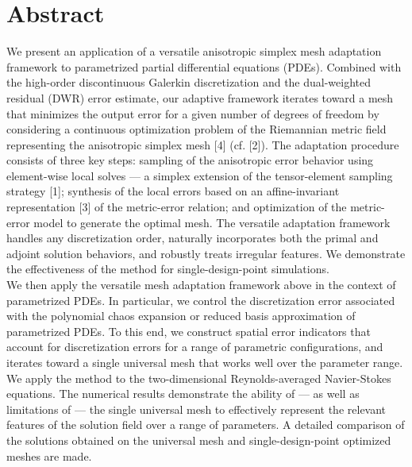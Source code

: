 \documentclass[article,A4,11pt]{llncs}%
\begin{document}
\section*{Abstract}
We present an application of a versatile anisotropic simplex mesh adaptation framework to parametrized partial differential equations (PDEs). Combined with the high-order discontinuous Galerkin discretization and the dual-weighted residual (DWR) error estimate, our adaptive framework iterates toward a mesh that minimizes the output error for a given number of degrees of freedom by considering a continuous
optimization problem of the Riemannian metric field representing the anisotropic simplex mesh [4] (cf. [2]). The adaptation procedure consists of three key steps: sampling of the anisotropic error behavior using element-wise local solves --- a simplex extension of the tensor-element sampling strategy [1]; synthesis of the local errors based on an affine-invariant representation [3] of the metric-error relation; and optimization of the  metric-error model to generate the optimal mesh. The versatile adaptation framework handles any discretization order, naturally incorporates both 
the primal and adjoint solution behaviors, and robustly treats irregular features. We demonstrate the effectiveness of the method for single-design-point simulations.
\\
We then apply the versatile mesh adaptation framework above in the context of
parametrized PDEs. In particular, we control the 
discretization error associated with the polynomial chaos expansion or
reduced basis approximation of parametrized PDEs. To this end, we construct spatial error indicators that account for
discretization errors for a range of parametric configurations, and iterates toward a single universal mesh that works well over the
parameter range. We apply the method to the two-dimensional Reynolds-averaged Navier-Stokes equations. The numerical results demonstrate the ability of --- as well as limitations of --- the single universal mesh to effectively represent the
relevant features of the solution field over a range of parameters. A detailed comparison of the solutions obtained on the universal mesh
and single-design-point optimized meshes are made.
\end{document}
